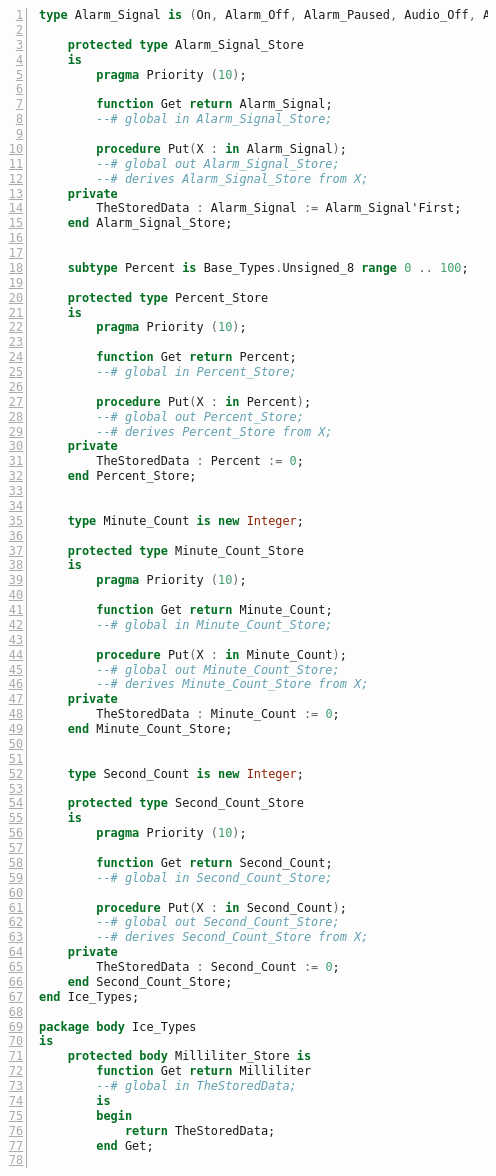 \begin{lstlisting}[language=ada, gobble=0, numbers=left, caption={\lstinline{Ice_Types} package}, label={listing:pca_generated:ice_types}]
    type Alarm_Signal is (On, Alarm_Off, Alarm_Paused, Audio_Off, Audio_Paused);

    protected type Alarm_Signal_Store
    is
        pragma Priority (10);

        function Get return Alarm_Signal;
        --# global in Alarm_Signal_Store;

        procedure Put(X : in Alarm_Signal);
        --# global out Alarm_Signal_Store;
        --# derives Alarm_Signal_Store from X;
    private
        TheStoredData : Alarm_Signal := Alarm_Signal'First;
    end Alarm_Signal_Store;


    subtype Percent is Base_Types.Unsigned_8 range 0 .. 100;

    protected type Percent_Store
    is
        pragma Priority (10);

        function Get return Percent;
        --# global in Percent_Store;

        procedure Put(X : in Percent);
        --# global out Percent_Store;
        --# derives Percent_Store from X;
    private
        TheStoredData : Percent := 0;
    end Percent_Store;


    type Minute_Count is new Integer;

    protected type Minute_Count_Store
    is
        pragma Priority (10);

        function Get return Minute_Count;
        --# global in Minute_Count_Store;

        procedure Put(X : in Minute_Count);
        --# global out Minute_Count_Store;
        --# derives Minute_Count_Store from X;
    private
        TheStoredData : Minute_Count := 0;
    end Minute_Count_Store;


    type Second_Count is new Integer;

    protected type Second_Count_Store
    is
        pragma Priority (10);

        function Get return Second_Count;
        --# global in Second_Count_Store;

        procedure Put(X : in Second_Count);
        --# global out Second_Count_Store;
        --# derives Second_Count_Store from X;
    private
        TheStoredData : Second_Count := 0;
    end Second_Count_Store;
end Ice_Types;

package body Ice_Types
is
    protected body Milliliter_Store is
        function Get return Milliliter
        --# global in TheStoredData;
        is
        begin
            return TheStoredData;
        end Get;


\end{lstlisting}
